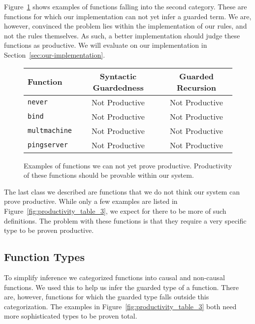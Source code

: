 Figure~\ref{fig:productivity_table_2} shows examples of functions falling into
the second category. These are functions for which our implementation can not
yet infer a guarded term. We are, however, convinced the problem lies within the
implementation of our rules, and not the rules themselves. As such, a better
implementation should judge these functions as productive. We will evaluate on
our implementation in Section~\ref{sec:our-implementation}.

\begin{figure}[h]
\begin{center}
  \begin{tabular}{| l | c | c |} \hline
    Function & Syntactic Guardedness & Guarded Recursion \\ \hline
    \texttt{never} & Not Productive & Not Productive \\ \hline
    \texttt{bind} & Not Productive & Not Productive \\ \hline
    \texttt{multmachine} & Not Productive & Not Productive \\ \hline
    \texttt{pingserver} & Not Productive & Not Productive \\ \hline
  \end{tabular}
\end{center}
  \caption{Examples of functions we can not yet prove productive. Productivity
    of these
    functions should be provable within our system.}
  \label{fig:productivity_table_2}
\end{figure}

The last class we described are functions that we do not think our system can
prove productive. While only a few examples are listed in
Figure~\ref{fig:productivity_table_3}, we expect for there to be more of such
definitions. The problem with these functions is that they require a very specific
type to be proven productive.

\subsection{Function Types}
\label{sec:function-types}
To simplify inference we categorized functions into causal and
non-causal functions. We used this to help us infer the guarded type of a function. There
are, however, functions for which the guarded type falls outside this
categorization. The examples in Figure~\ref{fig:productivity_table_3} both need
more sophisticated types to be proven total.

